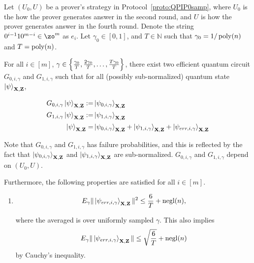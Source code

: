 \begin{lemma}\label{lem:partition2}
Let $(U_0,U)$ be a prover's strategy in Protocol~\ref{proto:QPIP0samp}, where $U_0$ is the how the prover generates answer in the second round, and $U$ is how the prover generates answer in the fourth round. Denote the string $0^{i-1}10^{m-i} \in \zo^m $ as $e_i$.  Let $\gamma_0 \in[0,1]$, and $T\in \mathbb{N}$ such that $\gamma_0=1/\operatorname*{\operatorname{poly}}(n)$ and $T=\operatorname*{\operatorname{poly}}(n)$.

 For all $i\in[m]$, $\gamma \in \left\{\frac{\gamma_0}{T},\frac{2\gamma_0}{T},\dots,\frac{T\gamma_0}{T}\right\}$, there exist two efficient quantum circuit $G_{0,i,\gamma}$ and $G_{1,i,\gamma}$ such that for all (possibly sub-normalized)  quantum state $\ket{\psi}_{\mathbf{X},\mathbf{Z}}$,   

\begin{align}
    G_{0,i,\gamma}\ket{\psi}_{\mathbf{X},\mathbf{Z}} :=& \ket{\psi_{0,i,\gamma}}_{\mathbf{X},\mathbf{Z}} \\ G_{1,i,\gamma}\ket{\psi}_{\mathbf{X},\mathbf{Z}} :=& \ket{\psi_{1,i,\gamma}}_{\mathbf{X},\mathbf{Z}}  \\
    \ket{\psi}_{\mathbf{X},\mathbf{Z}} =&   \ket{\psi_{0,i,\gamma}}_{\mathbf{X},\mathbf{Z}}+ \ket{\psi_{1,i,\gamma}}_{\mathbf{X},\mathbf{Z}}+\ket{\psi_{err,i,\gamma}}_{\mathbf{X},\mathbf{Z}}
\end{align}


 

 
  Note that $G_{0,i,\gamma}$ and $G_{1,i,\gamma}$ has failure probabilities, and this is reflected by the fact that $\ket{\psi_{0,i,\gamma}}_{\mathbf{X},\mathbf{Z}}$ and $\ket{\psi_{1,i,\gamma}}_{\mathbf{X},\mathbf{Z}}$ are  sub-normalized. $G_{0,i,\gamma}$ and $G_{1,i,\gamma}$ depend on $(U_0,U)$.

 


Furthermore, the following properties are satisfied for all $i\in[m]$.
%
\begin{enumerate}
    \item \label{property:partition-err}  $$E_{\gamma}\|\ket{\psi_{err,i,\gamma}}_{\mathbf{X},\mathbf{Z}}\|^2 \leq \frac{6}{T}+\operatorname{negl}(n),$$
    
    where the averaged is over uniformly sampled $\gamma$. This also implies
    \begin{align}
        E_{\gamma}\|\ket{\psi_{err,i,\gamma}}_{\mathbf{X},\mathbf{Z}}\| \leq \sqrt{\frac{6}{T}}+\operatorname{negl}(n)
    \end{align}
by Cauchy's inequality.
    

\end{enumerate}
\end{lemma}
